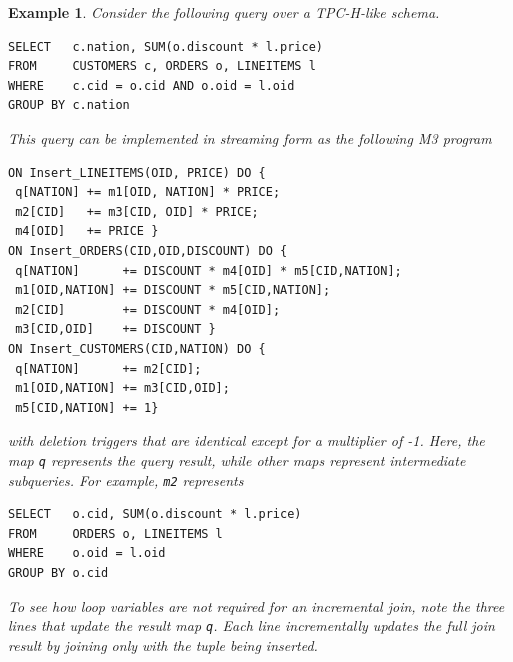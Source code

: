 \documentclass{vldb}
\newtheorem{example}[theorem]{Example}
\begin{document}
\begin{example}
Consider the following query over a TPC-H-like schema.
\begin{verbatim}
SELECT   c.nation, SUM(o.discount * l.price)
FROM     CUSTOMERS c, ORDERS o, LINEITEMS l
WHERE    c.cid = o.cid AND o.oid = l.oid
GROUP BY c.nation
\end{verbatim}

This query can be implemented in streaming form as the following M3 program
\begin{verbatim}
ON Insert_LINEITEMS(OID, PRICE) DO {
 q[NATION] += m1[OID, NATION] * PRICE;
 m2[CID]   += m3[CID, OID] * PRICE;
 m4[OID]   += PRICE }
ON Insert_ORDERS(CID,OID,DISCOUNT) DO {
 q[NATION]      += DISCOUNT * m4[OID] * m5[CID,NATION];
 m1[OID,NATION] += DISCOUNT * m5[CID,NATION];
 m2[CID]        += DISCOUNT * m4[OID];
 m3[CID,OID]    += DISCOUNT }
ON Insert_CUSTOMERS(CID,NATION) DO {
 q[NATION]      += m2[CID];
 m1[OID,NATION] += m3[CID,OID];
 m5[CID,NATION] += 1}
\end{verbatim}
with deletion triggers that are identical except for a multiplier of -1.  Here, the map \texttt{q} represents the query result, while other maps represent intermediate subqueries.  For example, \texttt{m2} represents 
\begin{verbatim}
SELECT   o.cid, SUM(o.discount * l.price) 
FROM     ORDERS o, LINEITEMS l
WHERE    o.oid = l.oid
GROUP BY o.cid
\end{verbatim}
To see how loop variables are not required for an incremental join, note the three lines that update the result map \texttt{q}.  Each line incrementally updates the full join result by joining only with the tuple being inserted.
\end{example}
\end{document}
